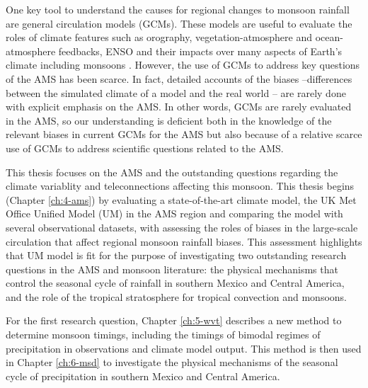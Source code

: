 
One key tool to understand the causes for regional changes to monsoon rainfall are general circulation models (GCMs). These models are useful to evaluate the roles of climate features such as orography, vegetation-atmosphere and ocean-atmosphere feedbacks, ENSO and their impacts over many aspects of Earth's climate including monsoons \citep{zhou2016}. However, the use of GCMs to address key questions of the AMS has been scarce. In fact, detailed accounts of the biases --differences between the simulated climate of a model and the real world -- are rarely done with explicit emphasis on the AMS. 
In other words, GCMs are rarely evaluated in the AMS, so our understanding is deficient both in the knowledge of the relevant biases in current GCMs for the AMS but also because of a relative scarce use of GCMs to address scientific questions related to the AMS. 


 This thesis focuses on the AMS and the outstanding questions regarding the climate variablity and teleconnections affecting this monsoon.
 This thesis begins (Chapter \ref{ch:4-ams}) by evaluating a state-of-the-art climate model, the UK Met Office Unified Model (UM) in the AMS region and comparing the model with several observational datasets, with assessing the roles of biases in the large-scale circulation that affect regional monsoon rainfall biases.
 This assessment highlights that UM model is fit for the purpose of investigating two outstanding research questions in the AMS and monsoon literature: the physical mechanisms that control the seasonal cycle of rainfall in southern Mexico and Central America, and the role of the tropical stratosphere for tropical convection and monsoons. 
 
 For the first research question, Chapter \ref{ch:5-wvt} describes a new method to determine monsoon timings, including the timings of bimodal regimes of precipitation in observations and climate model output. This method is then used in Chapter \ref{ch:6-msd} to investigate the physical mechanisms of the seasonal cycle of precipitation in southern Mexico and Central America.
 
